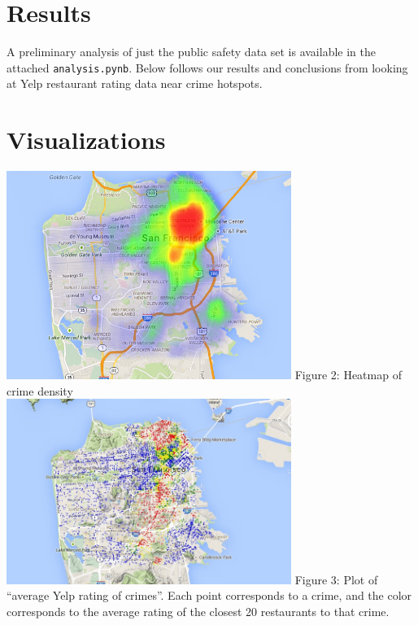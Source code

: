 \documentclass{article}
\begin{document}
\section{Results}
\label{sec:results}

A preliminary analysis of just the public safety data set is available in
the attached \texttt{analysis.pynb}. Below follows our results and
conclusions from looking at Yelp restaurant rating data near crime
hotspots.

\section{Visualizations}

\begin{center}
  \includegraphics[keepaspectratio=true, width=350px]{crime_density_heatmap.png}
  Figure 2: Heatmap of crime density \\[20pt]

  \includegraphics[keepaspectratio=true, width=350px]{all_yelp_ratings_plotted.jpg}
  Figure 3: Plot of ``average Yelp rating of crimes''. Each point
  corresponds to a crime, and the color corresponds to the average rating
  of the closest 20 restaurants to that crime. \\[20pt]


\end{center}
\end{document}
